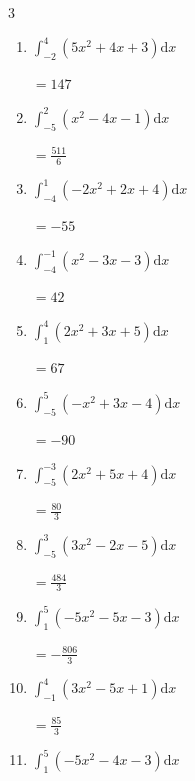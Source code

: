 \begin{multicols}{3}
\begin{enumerate}
        $\displaystyle =-\frac{1169}{6}$

  \item $\displaystyle \int_{-2}^{4}\left( 5x^{2}+4x+3 \right) \mathrm{d}x$

        $\displaystyle =147$

\columnbreak %

\resetques

  \item $\displaystyle \int_{-5}^{2}\left( x^{2}-4x-1 \right) \mathrm{d}x$

        $\displaystyle =\frac{511}{6}$

  \item $\displaystyle \int_{-4}^{1}\left( -2x^{2}+2x+4 \right) \mathrm{d}x$

        $\displaystyle =-55$

  \item $\displaystyle \int_{-4}^{-1}\left( x^{2}-3x-3 \right) \mathrm{d}x$

        $\displaystyle =42$

  \item $\displaystyle \int_{1}^{4}\left( 2x^{2}+3x+5 \right) \mathrm{d}x$

        $\displaystyle =67$

  \item $\displaystyle \int_{-5}^{5}\left( -x^{2}+3x-4 \right) \mathrm{d}x$

        $\displaystyle =-90$

\columnbreak %

  \item $\displaystyle \int_{-5}^{-3}\left( 2x^{2}+5x+4 \right) \mathrm{d}x$

        $\displaystyle =\frac{80}{3}$

  \item $\displaystyle \int_{-5}^{3}\left( 3x^{2}-2x-5 \right) \mathrm{d}x$

        $\displaystyle =\frac{484}{3}$

  \item $\displaystyle \int_{1}^{5}\left( -5x^{2}-5x-3 \right) \mathrm{d}x$

        $\displaystyle =-\frac{806}{3}$

  \item $\displaystyle \int_{-1}^{4}\left( 3x^{2}-5x+1 \right) \mathrm{d}x$

        $\displaystyle =\frac{85}{3}$

  \item $\displaystyle \int_{1}^{5}\left( -5x^{2}-4x-3 \right) \mathrm{d}x$


\end{enumerate}
\end{multicols}

